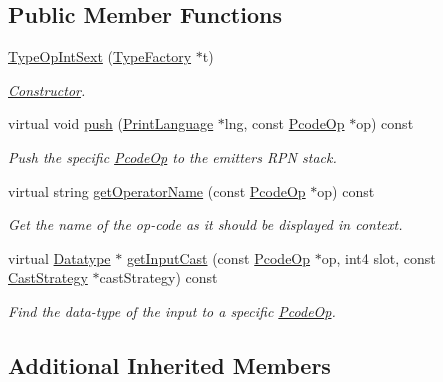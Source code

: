 \subsection*{Public Member Functions}
\begin{DoxyCompactItemize}
\item 
\mbox{\hyperlink{class_type_op_int_sext_ae0ff398724826a1b5e5d60e3b8a976bf}{Type\+Op\+Int\+Sext}} (\mbox{\hyperlink{class_type_factory}{Type\+Factory}} $\ast$t)
\begin{DoxyCompactList}\small\item\em \mbox{\hyperlink{class_constructor}{Constructor}}. \end{DoxyCompactList}\item 
virtual void \mbox{\hyperlink{class_type_op_int_sext_a4d2972f2739cfc477d2f9762c94417c0}{push}} (\mbox{\hyperlink{class_print_language}{Print\+Language}} $\ast$lng, const \mbox{\hyperlink{class_pcode_op}{Pcode\+Op}} $\ast$op) const
\begin{DoxyCompactList}\small\item\em Push the specific \mbox{\hyperlink{class_pcode_op}{Pcode\+Op}} to the emitter\textquotesingle{}s R\+PN stack. \end{DoxyCompactList}\item 
virtual string \mbox{\hyperlink{class_type_op_int_sext_abffb4d378c42466a11615363162d9fdb}{get\+Operator\+Name}} (const \mbox{\hyperlink{class_pcode_op}{Pcode\+Op}} $\ast$op) const
\begin{DoxyCompactList}\small\item\em Get the name of the op-\/code as it should be displayed in context. \end{DoxyCompactList}\item 
virtual \mbox{\hyperlink{class_datatype}{Datatype}} $\ast$ \mbox{\hyperlink{class_type_op_int_sext_a31eb9e0cd6e259e779d2b045604323dd}{get\+Input\+Cast}} (const \mbox{\hyperlink{class_pcode_op}{Pcode\+Op}} $\ast$op, int4 slot, const \mbox{\hyperlink{class_cast_strategy}{Cast\+Strategy}} $\ast$cast\+Strategy) const
\begin{DoxyCompactList}\small\item\em Find the data-\/type of the input to a specific \mbox{\hyperlink{class_pcode_op}{Pcode\+Op}}. \end{DoxyCompactList}\end{DoxyCompactItemize}
\subsection*{Additional Inherited Members}


